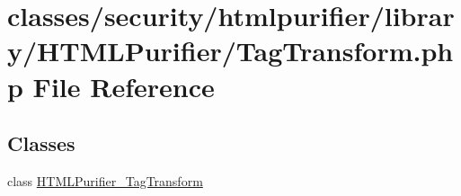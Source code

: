 \hypertarget{TagTransform_8php}{\section{classes/security/htmlpurifier/library/\+H\+T\+M\+L\+Purifier/\+Tag\+Transform.php File Reference}
\label{TagTransform_8php}
}
\subsection*{Classes}
\begin{DoxyCompactItemize}
\item 
class \hyperlink{classHTMLPurifier__TagTransform}{H\+T\+M\+L\+Purifier\+\_\+\+Tag\+Transform}
\end{DoxyCompactItemize}
